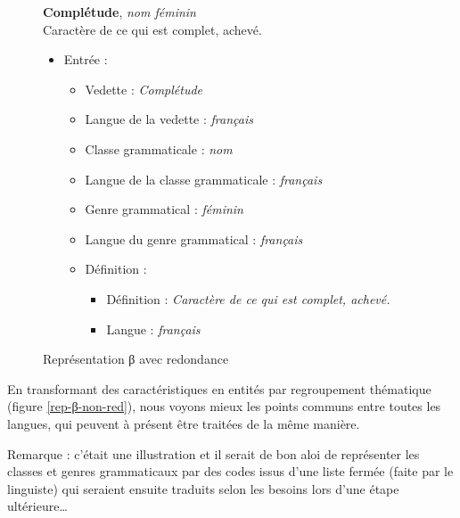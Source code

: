 \documentclass[10pt]{report}
\newcommand{\entité}[1]{\textcolor{blue!60!black}{#1}}
\newcommand{\caractéristique}[1]{\textcolor{green!60!black}{#1}}
\newcommand{\entitétechnique}[1]{\textcolor{blue!50!red}{#1}}
\begin{document}
\begin{figure}[H]
	\centering
	\begin{minipage}{0.3\linewidth}
    \textbf{Complétude}, \textit{nom féminin}\\    
    Caractère de ce qui est complet, achevé.
	\end{minipage}%
	\begin{minipage}{0.5\linewidth}
    \begin{itemize}
    	\item \entité{Entrée} :
    	\begin{itemize}
        \item \caractéristique{Vedette} : \textit{Complétude}
        \item \caractéristique{Langue de la vedette} : \textit{français}
        \item \caractéristique{Classe grammaticale} : \textit{nom}
        \item \caractéristique{Langue de la classe grammaticale} : \textit{français}
        \item \caractéristique{Genre grammatical} : \textit{féminin}
        \item \caractéristique{Langue du genre grammatical} : \textit{français}
        \item \entité{Définition} :
        \begin{itemize}
        	\item \caractéristique{Définition} : \textit{Caractère de ce qui est complet, achevé.}
        	\item \caractéristique{Langue} : \textit{français}
        \end{itemize}
    	\end{itemize}
    \end{itemize}
	\end{minipage}
	\caption{Représentation β avec redondance}
	\label{rep-β-red}
\end{figure}

En transformant des caractéristiques en entités par regroupement thématique (figure \ref{rep-β-non-red}), nous voyons mieux les points communs entre toutes les \caractéristique{langues}, qui peuvent à présent être traitées de la même manière.

\bigskip

Remarque : c’était une illustration et il serait de bon aloi de représenter les classes et genres grammaticaux par des codes issus d’une liste fermée (faite par le linguiste) qui seraient ensuite traduits selon les besoins lors d’une étape ultérieure…
\end{document}
